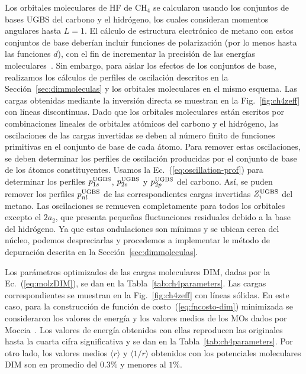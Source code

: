 Los orbitales moleculares de HF de CH$_4$ se calcularon usando los 
conjuntos de bases UGBS del carbono y el hidrógeno, los cuales 
consideran momentos angulares hasta $L=1$. El cálculo de estructura 
electrónico de metano con estos conjuntos de base deberían incluir 
funciones de polarización (por lo menos hasta las funciones $d$), con el 
fin de incrementar la precisión de las energías  
moleculares~\cite{Rothenberg:71,Hariharan:72}. Sin embargo, para aislar 
los efectos de los conjuntos de base, realizamos los cálculos de 
perfiles de oscilación descritos en la Sección~\ref{sec:dimmoleculas} y 
los orbitales moleculares en el mismo esquema. Las cargas obtenidas 
mediante la inversión directa se muestran en la Fig.~\ref{fig:ch4zeff} 
con líneas discontinuas. Dado que los orbitales moleculares están 
escritos por combinaciones lineales de orbitales atómicos del carbono y 
el hidrógeno, las oscilaciones de las cargas invertidas se deben al 
número finito de funciones primitivas en el conjunto de base de cada 
átomo. Para remover estas oscilaciones, se deben determinar los perfiles 
de oscilación producidas por el conjunto de base de los átomos 
constituyentes. Usamos la Ec.~(\ref{eq:oscillation-prof}) para 
determinar los perfiles $p_{1s}^{\mbox{\scriptsize UGBS}}$, 
$p_{2s}^{\mbox{\scriptsize UGBS}}$ y $p_{2p}^{\mbox{\scriptsize UGBS}}$ 
del carbono. Así, se puden remover los perfiles 
$p_{nl}^{\mbox{\scriptsize UGBS}}$ de las correspondientes cargas 
invertidas $Z_{i}^{\mbox{\scriptsize UGBS}}$ del metano. Las 
oscilaciones se remueven completamente para todos los orbitales excepto 
el $2a_2$, que presenta pequeñas fluctuaciones residuales debido a la 
base del hidrógeno. Ya que estas ondulaciones son mínimas y se ubican 
cerca del núcleo, podemos despreciarlas y procedemos a implementar le 
método de depuración descrita en la Sección~\ref{sec:dimmoleculas}. 

Los parámetros optimizados de las cargas moleculares DIM, dadas por la 
Ec.~(\ref{eq:molzDIM}), se dan en la Tabla~\ref{tab:ch4parameters}. Las 
cargas correspondientes se muestran en la Fig.~\ref{fig:ch4zeff} con 
líneas sólidas.  En este caso, para la construcción de función de 
costo~(\ref{eq:fncosto-dim}) minimizada se consideraron los valores de 
energía y los valores medios de los MOs dados por 
Moccia~\cite{Moccia:69}. Los valores de energía obtenidos con ellas 
reproducen las originales hasta la cuarta cifra significativa y se dan 
en la Tabla~\ref{tab:ch4parameters}. Por otro lado, los valores medios 
$\langle r\rangle$ y $\langle 1/r\rangle$ obtenidos con los potenciales 
moleculares DIM son en promedio del $0.3\%$ y menores al $1\%$.


